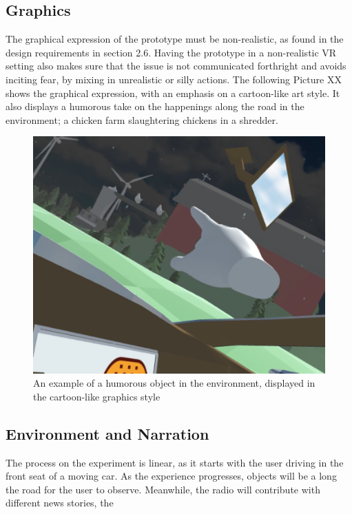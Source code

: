 \subsection{Graphics}
The graphical expression of the prototype must be non-realistic, as found in the design requirements in section 2.6. Having the prototype in a non-realistic VR setting also makes sure that the issue is not communicated forthright and avoids inciting fear, by mixing in unrealistic or silly actions. The following Picture XX shows the graphical expression, with an emphasis on a cartoon-like art style. It also displays a humorous take on the happenings along the road in the environment; a chicken farm slaughtering chickens in a shredder.

 \begin{figure}[H]
        	\centering
        	\includegraphics[width=0.9\linewidth]{figure/Design/Designpic3.png}
        	\caption{An example of a humorous object in the environment, displayed in the cartoon-like graphics style}
        	\label{fig:designpic3}
        \end{figure}
\subsection{Environment and Narration}
The process on the experiment is linear, as it starts with the user driving in the front seat of a moving car. As the experience progresses, objects will be a long the road for the user to observe. Meanwhile, the radio will contribute with different news stories, the

